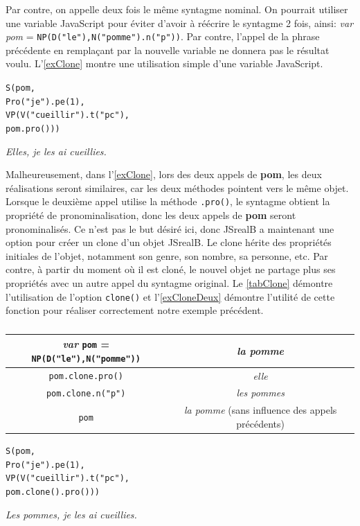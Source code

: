 \documentclass[11pt]{article} %
\newcommand{\system}[1]{\textsf{#1}}
\newcommand{\JSB}{\system{JSrealB}}
\newcommand{\real}[1]{\emph{#1}}
\begin{document}
Par contre, on appelle deux fois le même syntagme nominal. On pourrait
utiliser une variable JavaScript pour éviter d'avoir à réécrire le
syntagme 2 fois, ainsi: \emph{var pom} = \texttt{NP(D("le"),N("pomme").n("p"))}. Par contre, l'appel de la phrase précédente en remplaçant par la
nouvelle variable ne donnera pas le résultat voulu. L'\autoref{exClone} montre une utilisation
simple d'une variable JavaScript. 
\begin{example}
\caption{}
\begin{alltt}
S(pom,
  Pro("je").pe(1),
  VP(V("cueillir").t("pc"),
     pom.pro()))
\end{alltt}
\real{Elles, je les ai cueillies.}
\label{exClone}
\end{example}

Malheureusement, dans l'\autoref{exClone}, lors des deux appels de \textbf{pom}, les deux réalisations
seront similaires, car les deux méthodes pointent vers le même objet.
Lorsque le deuxième appel utilise la méthode \texttt{.pro()}, le syntagme
obtient la propriété de pronominalisation, donc les deux appels de
\textbf{pom} seront pronominalisés. Ce n'est pas le but désiré ici,
donc \JSB{} a maintenant une option pour créer un clone d'un objet
\JSB{}. Le clone hérite des propriétés initiales de l'objet, notamment
son genre, son nombre, sa personne, etc. Par contre, à partir du moment
où il est cloné, le nouvel objet ne partage plus ses propriétés avec
un autre appel du syntagme original. Le \autoref{tabClone} démontre l'utilisation
de l'option \texttt{clone()} et l'\autoref{exCloneDeux} démontre l'utilité de cette 
fonction pour réaliser correctement notre exemple précédent. \\
\begin{table}[ht]
\caption{}
\begin{tabular}{|c|c|}
\hline 
\emph{var} \texttt{pom} = \texttt{NP(D("le"),N("pomme"))} & \real{la pomme}\\
\hline 
\hline 
\texttt{pom.clone.pro()} & \real{elle}\\
\hline 
\texttt{pom.clone.n("p")} & \real{les pommes}\\
\hline 
\texttt{pom} & \real{la pomme} {\small{}(sans influence des appels
précédents)}\\
\hline 
\end{tabular} 
\label{tabClone}
\end{table}

\begin{example}
\caption{}
\begin{alltt}
S(pom,
  Pro("je").pe(1),
  VP(V("cueillir").t("pc"),
     pom.clone().pro()))
\end{alltt}
\real{Les pommes, je les ai cueillies.}
\label{exCloneDeux}
\end{example}
\end{document}
